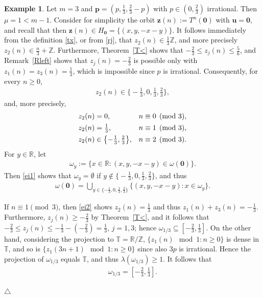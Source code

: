 \documentclass[11pt,reqno,tbtags,a4paper]{amsart}
\numberwithin{equation}{section}
\renewcommand\le{\leq}
\renewcommand\ge{\geq}
\renewcommand\leq{\leqslant}
\renewcommand\geq{\geqslant}
\theoremstyle{plain}%
\theoremstyle{definition}
\newcommand\xqed[1]{%
    \leavevmode\unskip\penalty9999 \hbox{}\nobreak\hfill
    \quad\hbox{#1}}
\newtheorem{exampleqqq}[theorem]{Example}
\newenvironment{example}{\begin{exampleqqq}}
  {\xqed{$\triangle$}\end{exampleqqq}}
\theoremstyle{remark}
\newcommand{\refT}[1]{Theorem~\ref{#1}}
\newcommand{\refR}[1]{Remark~\ref{#1}}
\newcommand\set[1]{\ensuremath{\{#1\}}}
\newcommand\bigset[1]{\ensuremath{\bigl\{#1\bigr\}}}
\newcommand\bbR{\mathbb R}
\newcommand\bbT{\mathbb T}
\newcommand\bbZ{\mathbb Z}
\newcommand\gl{\lambda}
\newcommand\cL{{\omega}}
\newcommand\Ho{H_{\0}}
\newcommand\vp{\mathbf{p}}
\newcommand\vu{\mathbf{u}}
\newcommand\vz{\mathbf{z}}
\newcommand\0{{\boldsymbol 0}}
\newcommand\1{{\boldsymbol 1}}
\begin{document}
\begin{example}\label{Einter1}
 Let $m=3$ and $\vp=(p,\frac13,\frac23-p)$ with $p\in(0,\frac23)$  irrational.
Then $\mu=1<m-1$. 
Consider for simplicity the orbit $\vz(n):=T^n(\0)$ with $\vu=\0$,
and recall that then $\vz(n)\in \Ho=\set{(x,y,-x-y)}$.
It follows immediately from the definition \eqref{tx}, or from \eqref{rj}, 
that $z_2(n)\in \frac13\bbZ$, and more precisely $z_2(n)\in \frac{n}3+\bbZ$.
Furthermore, \refT{T<} shows that $-\frac23\le z_j(n)\le \frac56$, 
and \refR{Rleft}
%
shows that
$z_j(n)=-\frac23$ is possible only with $z_1(n)=z_3(n)=\frac13$,
which is impossible since $p$ is irrational.
Consequently, for every $n\ge0$,
\begin{align}\label{ei1}
  z_2(n)\in\bigset{-\tfrac13,0,\tfrac13,\tfrac23},
\end{align}
and, more precisely,
\begin{align}\label{ei2}
&&  z_2(n) &= 0, && n\equiv 0 \pmod 3,&&\notag\\
&&  z_2(n) &= \tfrac13, && n\equiv 1 \pmod 3,&&\notag\\
&&  z_2(n) &\in\bigset{-\tfrac13,\tfrac23}, && n\equiv 2 \pmod 3.&&
\end{align}
For $y\in\bbR$, let
\begin{align}\label{eil}
  \cL_y:=\set{x\in\bbR:(x,y,-x-y)\in \cL(\0)}.
\end{align}
Then 
\eqref{ei1} shows that
$\cL_y=\emptyset$ if $y\notin\bigset{-\tfrac13,0,\tfrac13,\tfrac23}$,
and thus
\begin{align}\label{ei3}
  \cL(\0)=\bigcup_{y\in\set{-\tfrac13,0,\tfrac13,\tfrac23}}
\bigset{(x,y,-x-y):x\in\cL_y}.
\end{align}

If $n\equiv 1\pmod3$, then \eqref{ei2} shows $z_2(n)=\frac13$ and thus
$z_1(n)+z_3(n)=-\frac13$. Furthermore, $z_j(n)\ge-\frac23$ by \refT{T<}, and
it follows that $-\frac23\le z_j(n)\le-\frac13-(-\frac23)=\frac13$, $j=1,3$;
hence $\cL_{1/3}\subseteq[-\frac23,\frac13]$.
On the other hand, considering the projection to $\bbT=\bbR/\bbZ$,
$\set{z_1(n) \mod 1:n\ge0}$ is dense in $\bbT$,
and so is $\set{z_1(3n+1) \mod 1:n\ge0}$ since also $3p$ is irrational.
 Hence the projection of $\cL_{1/3}$ equals $\bbT$, and thus
$\gl(\cL_{1/3})\ge1$.
It follows that 
\begin{align}\label{ei4}
\cL_{1/3}=[-\tfrac23,\tfrac13].
\end{align}


\end{example}
\end{document}
